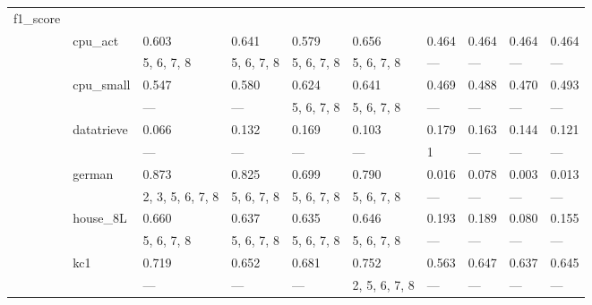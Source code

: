 \documentclass{article}
\begin{document}
\begin{center}
\begin{longtable}{p{1.2cm}p{1.8cm}p{1cm}p{1cm}p{1cm}p{1cm}p{1cm}p{1cm}p{1cm}p{1cm}}
 f1\_score    &              &                  &               &               &               &               &            &                  &               \\
             & cpu\_act      & 0.603            & 0.641         & 0.579         & 0.656         & 0.464         & 0.464      & 0.464            & 0.464         \\
             &              & 5, 6, 7, 8       & 5, 6, 7, 8    & 5, 6, 7, 8    & 5, 6, 7, 8    & ---           & ---        & ---              & ---           \\
             & cpu\_small    & 0.547            & 0.580         & 0.624         & 0.641         & 0.469         & 0.488      & 0.470            & 0.493         \\
             &              & ---              & ---           & 5, 6, 7, 8    & 5, 6, 7, 8    & ---           & ---        & ---              & ---           \\
             & datatrieve   & 0.066            & 0.132         & 0.169         & 0.103         & 0.179         & 0.163      & 0.144            & 0.121         \\
             &              & ---              & ---           & ---           & ---           & 1             & ---        & ---              & ---           \\
             & german       & 0.873            & 0.825         & 0.699         & 0.790         & 0.016         & 0.078      & 0.003            & 0.013         \\
             &              & 2, 3, 5, 6, 7, 8 & 5, 6, 7, 8    & 5, 6, 7, 8    & 5, 6, 7, 8    & ---           & ---        & ---              & ---           \\
             & house\_8L     & 0.660            & 0.637         & 0.635         & 0.646         & 0.193         & 0.189      & 0.080            & 0.155         \\
             &              & 5, 6, 7, 8       & 5, 6, 7, 8    & 5, 6, 7, 8    & 5, 6, 7, 8    & ---           & ---        & ---              & ---           \\
             & kc1          & 0.719            & 0.652         & 0.681         & 0.752         & 0.563         & 0.647      & 0.637            & 0.645         \\
             &              & ---              & ---           & ---           & 2, 5, 6, 7, 8 & ---           & ---        & ---              & ---           \\

\end{longtable}
\end{center}
\end{document}
